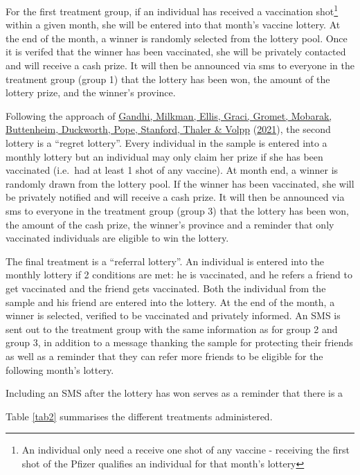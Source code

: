 \documentclass[11pt,preprint, authoryear]{elsarticle}
\numberwithin{equation}{section}
\numberwithin{figure}{section}
\numberwithin{table}{section}
\let\rmarkdownfootnote\footnote%
\def\footnote{\protect\rmarkdownfootnote}
\begin{document}
For the first treatment group, if an individual has received a
vaccination shot\footnote{An individual only need a receive one shot of
  any vaccine - receiving the first shot of the Pfizer qualifies an
  individual for that month's lottery} within a given month, she will be
entered into that month's vaccine lottery. At the end of the month, a
winner is randomly selected from the lottery pool. Once it is verifed
that the winner has been vaccinated, she will be privately contacted and
will receive a cash prize. It will then be announced via sms to everyone
in the treatment group (group 1) that the lottery has been won, the
amount of the lottery prize, and the winner's province.

Following the approach of \protect\hyperlink{ref-regret}{Gandhi,
Milkman, Ellis, Graci, Gromet, Mobarak, Buttenheim, Duckworth, Pope,
Stanford, Thaler \& Volpp} (\protect\hyperlink{ref-regret}{2021}), the
second lottery is a ``regret lottery''. Every individual in the sample
is entered into a monthly lottery but an individual may only claim her
prize if she has been vaccinated (i.e.~had at least 1 shot of any
vaccine). At month end, a winner is randomly drawn from the lottery
pool. If the winner has been vaccinated, she will be privately notified
and will receive a cash prize. It will then be announced via sms to
everyone in the treatment group (group 3) that the lottery has been won,
the amount of the cash prize, the winner's province and a reminder that
only vaccinated individuals are eligible to win the lottery.

The final treatment is a ``referral lottery''. An individual is entered
into the monthly lottery if 2 conditions are met: he is vaccinated, and
he refers a friend to get vaccinated and the friend gets vaccinated.
Both the individual from the sample and his friend are entered into the
lottery. At the end of the month, a winner is selected, verified to be
vaccinated and privately informed. An SMS is sent out to the treatment
group with the same information as for group 2 and group 3, in addition
to a message thanking the sample for protecting their friends as well as
a reminder that they can refer more friends to be eligible for the
following month's lottery.

Including an SMS after the lottery has won serves as a reminder that
there is a

Table \ref{tab2} summarises the different treatments administered.
\end{document}
